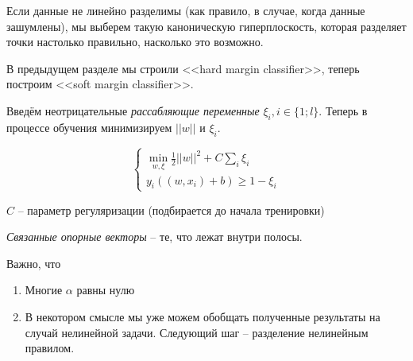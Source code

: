 \documentclass[main.tex]{subfiles}
\begin{document}
Если данные не линейно разделимы (как правило, в случае, когда данные зашумлены), мы выберем такую каноническую гиперплоскость, которая разделяет точки настолько правильно, насколько это возможно.

В предыдущем разделе мы строили <<hard margin classifier>>, теперь построим <<soft margin classifier>>.

Введём неотрицательные \emph{рассабляющие переменные} $ \xi_i, i \in \{ 1;l \} $.
Теперь в процессе обучения минимизируем $ || w || $ и $ \xi_i $.

\[ \begin{cases}
	\min_{w, \xi} \frac{1}{2} || w ||^2 + C \sum_i \xi_i \\
	y_i((w, x_i) + b) \ge 1 - \xi_i
\end{cases} \]

$ C $ -- параметр регуляризации (подбирается до начала тренировки)


\emph{Связанные опорные векторы} -- те, что лежат внутри полосы.

Важно, что

\begin{enumerate}[noitemsep]
	\item Многие $ \alpha $  равны нулю
	\item В некотором смысле мы уже можем обобщать полученные результаты на случай нелинейной задачи.
	Следующий шаг -- разделение нелинейным правилом. 
\end{enumerate}
\end{document}
